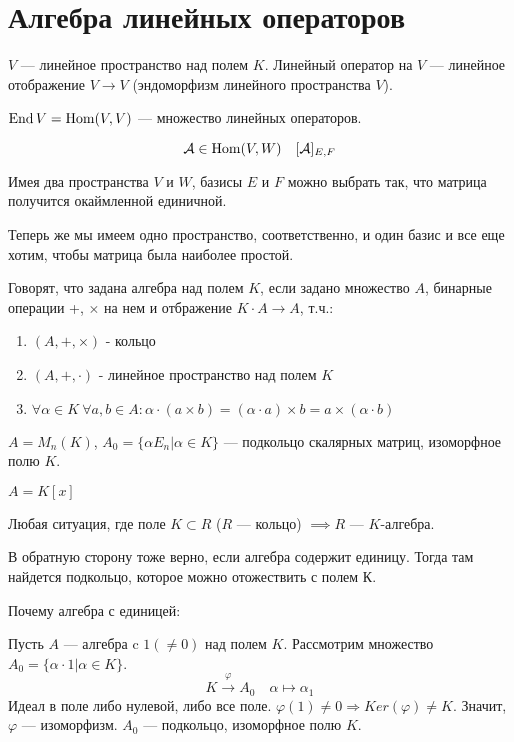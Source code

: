 \documentclass[main]{subfiles}
\begin{document}
\chapter{Алгебра линейных операторов} 

\begin{definition} 
    $V$ — линейное пространство над полем $K$.
    Линейный оператор на $V$ — линейное отображение $V \to V$ (эндоморфизм линейного пространства $V$).
\end{definition}
\begin{definition} 
    $\operatorname{End} V = \operatorname{Hom}(V, V)$ —  множество линейных операторов.
\end{definition}

\[\mathcal{A} \in \operatorname{Hom} (V, W) \quad [\mathcal{A}]_{E,F}\]

Имея два пространства $V$ и $W$, базисы $E$ и $F$ можно выбрать так, что матрица получится окаймленной единичной.

Теперь же мы имеем одно пространство, соответственно, и один базис и все еще хотим, чтобы матрица была наиболее простой.

\begin{definition} [Алгебра]
    Говорят, что задана алгебра над полем $K$, если задано множество $A$, бинарные операции +, $\times$ на нем и отбражение $K \cdot A \to A$, т.ч.:
    \begin{enumerate}
        \item $(A,+, \times)$ - кольцо
        \item $(A,+, \cdot)$ - линейное пространство над полем $K$
        \item $\forall \alpha \in K \  \forall a, b \in A : \alpha \cdot (a \times b) = (\alpha \cdot a) \times b = a \times (\alpha \cdot b)$
    \end{enumerate}
\end{definition}

\begin{example}
    $A = M_n(K)$,
    $A_0 = \{ \alpha E_n | \alpha \in K\}$ —  подкольцо скалярных матриц, изоморфное полю $K$.
\end{example}

\begin{example}
    $A = K[x]$
\end{example}
\begin{example}
    Любая ситуация, где поле $K \subset R$ ($R$ —  кольцо) $\implies R$ — $K$-алгебра.

    В обратную сторону тоже верно, если алгебра содержит единицу. Тогда там найдется подкольцо, которое можно отожествить с полем К.

    Почему алгебра с единицей:

    Пусть $A$ —  алгебра c $1(\neq0)$ над полем $K$.
    Рассмотрим множество $A_0 = \{\alpha \cdot 1| \alpha \in K\}$.
    \[K \xrightarrow{\varphi} A_0 \quad \alpha \mapsto \alpha_1\]
    Идеал в поле либо нулевой, либо все поле.
    $\varphi(1) \neq 0 \Rightarrow Ker(\varphi)\neq K$.
    Значит,  $\varphi$ — изоморфизм. $A_0$ — подкольцо, изоморфное полю $K$.
\end{example}
\end{document}

